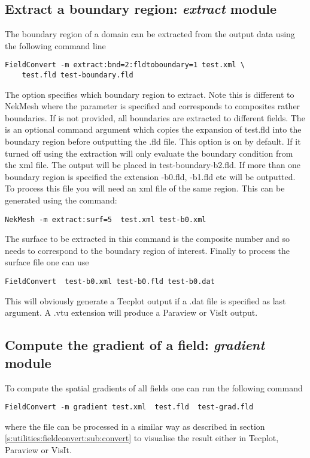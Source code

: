 \subsection{Extract a boundary region: \textit{extract} module}
The boundary region of a domain can be extracted from the output
data using the following command line
%
\begin{lstlisting}[style=BashInputStyle]
FieldConvert -m extract:bnd=2:fldtoboundary=1 test.xml \
	test.fld test-boundary.fld
\end{lstlisting}
%
The option  specifies which boundary region to extract.
Note this is different to NekMesh where the parameter \inltt{surf}
is specified and corresponds to composites rather boundaries. If 
is not provided, all boundaries are extracted to different fields. The 
is an optional command argument which copies the expansion of test.fld into
the boundary region before outputting the .fld file. This option is on by default.
If it turned off using \inltt{fldtoboundary=0} the extraction will only evaluate the
boundary condition from the xml file. The output will be placed in test-boundary-b2.fld.
If more than one boundary region is specified the extension -b0.fld, -b1.fld etc will be
outputted. To process this file you will need an xml file of the same region.
This can be generated using the command:
%
\begin{lstlisting}[style=BashInputStyle]
NekMesh -m extract:surf=5  test.xml test-b0.xml
\end{lstlisting}
%
The surface to be extracted in this command is the composite
number and so needs to correspond to the boundary region
of interest. Finally to process the surface file one can use
%
\begin{lstlisting}[style=BashInputStyle]
FieldConvert  test-b0.xml test-b0.fld test-b0.dat
\end{lstlisting}
%
This will obviously generate a Tecplot output if a .dat file 
is specified as last argument. A .vtu extension will produce 
a Paraview or VisIt output.
%
%
%
\subsection{Compute the gradient of a field: \textit{gradient} module}
To compute the spatial gradients of all fields one can run the following command
%
\begin{lstlisting}[style=BashInputStyle]
FieldConvert -m gradient test.xml  test.fld  test-grad.fld
\end{lstlisting}
%
where the file  can be processed in a similar
way as described in section \ref{s:utilities:fieldconvert:sub:convert}
to visualise the result either in Tecplot, Paraview or VisIt.
%
%

